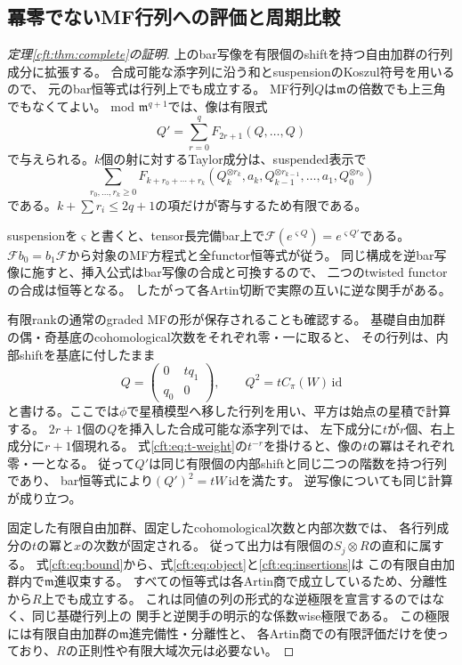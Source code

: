 \subsection{冪零でないMF行列への評価と周期比較}
\begin{proof}[定理\ref{cft:thm:complete}の証明]
上のbar写像を有限個のshiftを持つ自由加群の行列成分に拡張する。
合成可能な添字列に沿う和とsuspensionのKoszul符号を用いるので、
元のbar恒等式は行列上でも成立する。
MF行列$Q$は$\mathfrak m$の倍数でも上三角でもなくてよい。
mod $\mathfrak m^{q+1}$では、像は有限式
\begin{equation}\label{cft:eq:object}
 Q'=\sum_{r=0}^{q}F_{2r+1}(Q,\ldots,Q)
\end{equation}
で与えられる。$k$個の射に対するTaylor成分は、suspended表示で
\begin{equation}\label{cft:eq:insertions}
 \sum_{r_0,\ldots,r_k\ge0}
 F_{k+r_0+\cdots+r_k}
 (Q_k^{\otimes r_k},a_k,Q_{k-1}^{\otimes r_{k-1}},\ldots,a_1,Q_0^{\otimes r_0})
\end{equation}
である。$k+\sum r_i\le2q+1$の項だけが寄与するため有限である。

suspensionを$\varsigma$と書くと、tensor長完備bar上で$\mathcal F(e^{\varsigma Q})=e^{\varsigma Q'}$である。
$\mathcal F b_0=b_1\mathcal F$から対象のMF方程式と全functor恒等式が従う。
同じ構成を逆bar写像に施すと、挿入公式はbar写像の合成と可換するので、
二つのtwisted functorの合成は恒等となる。
したがって各Artin切断で実際の互いに逆な関手がある。

有限rankの通常のgraded MFの形が保存されることも確認する。
基礎自由加群の偶・奇基底のcohomological次数をそれぞれ零・一に取ると、
その行列は、内部shiftを基底に付したまま
\begin{equation}\label{cft:eq:two-block-matrix}
 Q=\begin{pmatrix}0&tq_1\\q_0&0\end{pmatrix},
 \qquad Q^2=tC_\pi(W)\,\mathrm{id}
\end{equation}
と書ける。ここでは$\phi$で星積模型へ移した行列を用い、平方は始点の星積で計算する。
$2r+1$個の$Q$を挿入した合成可能な添字列では、
左下成分に$t$が$r$個、右上成分に$r+1$個現れる。
式\eqref{cft:eq:t-weight}の$t^{-r}$を掛けると、像の$t$の冪はそれぞれ零・一となる。
従って$Q'$は同じ有限個の内部shiftと同じ二つの階数を持つ行列であり、
bar恒等式により$(Q')^2=tW\,\mathrm{id}$を満たす。
逆写像についても同じ計算が成り立つ。

固定した有限自由加群、固定したcohomological次数と内部次数では、
各行列成分の$t$の冪と$x$の次数が固定される。
従って出力は有限個の$S_j\otimes R$の直和に属する。
式\eqref{cft:eq:bound}から、式\eqref{cft:eq:object}と\eqref{cft:eq:insertions}は
この有限自由加群内で$\mathfrak m$進収束する。
すべての恒等式は各Artin商で成立しているため、分離性から$R$上でも成立する。
これは同値の列の形式的な逆極限を宣言するのではなく、同じ基礎行列上の
関手と逆関手の明示的な係数wise極限である。
この極限には有限自由加群の$\mathfrak m$進完備性・分離性と、
各Artin商での有限評価だけを使っており、$R$の正則性や有限大域次元は必要ない。


\end{proof}

